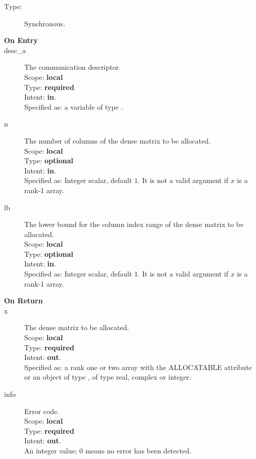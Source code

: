 \begin{description}
\item[Type:] Synchronous.
\item[\bf On Entry]
\item[desc\_a] The communication descriptor.\\
Scope: {\bf local} \\
Type: {\bf required}\\
Intent: {\bf in}.\\
Specified as: a variable of type \descdata.\\
\item[n] The number of columns of the dense matrix to be allocated.\\
Scope: {\bf local} \\
Type: {\bf optional}\\
Intent: {\bf in}.\\
Specified as: Integer scalar, default $1$. It is not a valid argument  if $x$ is a
rank-1 array. 
\item[lb] The lower bound for the column index range of the dense matrix to be allocated.\\
Scope: {\bf local} \\
Type: {\bf optional}\\
Intent: {\bf in}.\\
Specified as: Integer scalar, default $1$. It is not a valid argument if $x$ is a
rank-1 array. 
\end{description}

\begin{description}
\item[\bf On Return]
\item[x] The dense matrix to be allocated.\\
Scope: {\bf local} \\
Type: {\bf required}\\
Intent: {\bf out}.\\
Specified as: a rank one or two array with the ALLOCATABLE  attribute
or an object of type \vdata, of type real, complex or integer.\\ 
\item[info] Error code.\\
Scope: {\bf local} \\
Type: {\bf required} \\
Intent: {\bf out}.\\
An integer value; 0 means no error has been detected. 
\end{description}


